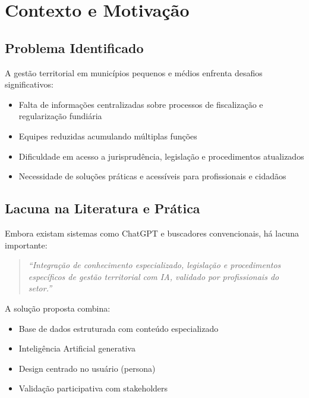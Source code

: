 \documentclass[12pt,a4paper]{report}
\begin{document}
\newpage

\chapter{Contexto e Motivação}

\section{Problema Identificado}

A gestão territorial em municípios pequenos e médios enfrenta desafios significativos:

\begin{itemize}
  \item Falta de informações centralizadas sobre processos de fiscalização e regularização fundiária
  \item Equipes reduzidas acumulando múltiplas funções
  \item Dificuldade em acesso a jurisprudência, legislação e procedimentos atualizados
  \item Necessidade de soluções práticas e acessíveis para profissionais e cidadãos
\end{itemize}

\section{Lacuna na Literatura e Prática}

Embora existam sistemas como ChatGPT e buscadores convencionais, há lacuna importante:

\begin{quote}
  \textit{``Integração de conhecimento especializado, legislação e procedimentos específicos de gestão territorial com IA, validado por profissionais do setor.''}
\end{quote}

A solução proposta combina:
\begin{itemize}
  \item Base de dados estruturada com conteúdo especializado
  \item Inteligência Artificial generativa
  \item Design centrado no usuário (persona)
  \item Validação participativa com stakeholders
\end{itemize}

\newpage
\end{document}
